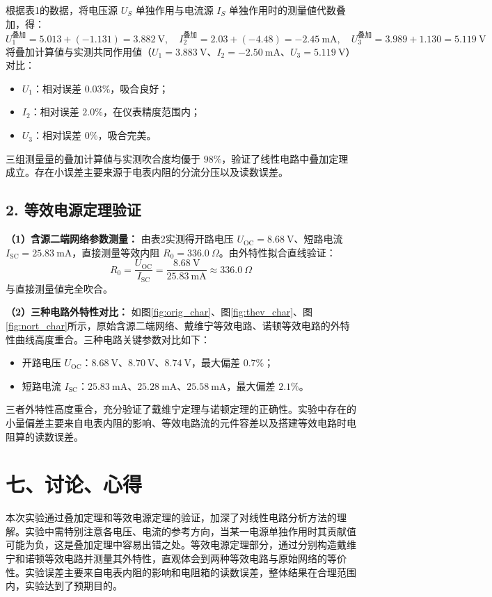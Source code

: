 ﻿\documentclass[10.5pt]{config}
\begin{document}
根据表1的数据，将电压源 $U_S$ 单独作用与电流源 $I_S$ 单独作用时的测量値代数叠加，得：
\begin{equation*}
    U_1^{\text{叠加}} = 5.013 + (-1.131) = 3.882\ \mathrm{V},\quad
    I_2^{\text{叠加}} = 2.03 + (-4.48) = -2.45\ \mathrm{mA},\quad
    U_3^{\text{叠加}} = 3.989 + 1.130 = 5.119\ \mathrm{V}
\end{equation*}
将叠加计算値与实测共同作用値（$U_1=3.883\ \mathrm{V}$、$I_2=-2.50\ \mathrm{mA}$、$U_3=5.119\ \mathrm{V}$）对比：
\begin{itemize}
    \item $U_1$：相对误差 $0.03\%$，吸合良好；
    \item $I_2$：相对误差 $2.0\%$，在仪表精度范围内；
    \item $U_3$：相对误差 $0\%$，吸合完美。
\end{itemize}
三组测量量的叠加计算値与实测吹合度均優于 $98\%$，验证了线性电路中叠加定理成立。存在小误差主要来源于电表内阻的分流分压以及读数误差。

\subsection*{2. 等效电源定理验证}

\textbf{（1）含源二端网络参数测量：}
由表2实测得开路电压 $U_{\mathrm{OC}} = 8.68\ \mathrm{V}$、短路电流 $I_{\mathrm{SC}} = 25.83\ \mathrm{mA}$，直接测量等效内阻 $R_0 = 336.0\ \Omega$。由外特性拟合直线验证：
\begin{equation*}
    R_0 = \frac{U_{\mathrm{OC}}}{I_{\mathrm{SC}}} = \frac{8.68\ \mathrm{V}}{25.83\ \mathrm{mA}} \approx 336.0\ \Omega
\end{equation*}
与直接测量値完全吹合。

\textbf{（2）三种电路外特性对比：}
如图\ref{fig:orig_char}、图\ref{fig:thev_char}、图\ref{fig:nort_char}所示，原始含源二端网络、戴维宁等效电路、诺顿等效电路的外特性曲线高度重合。三种电路关键参数对比如下：
\begin{itemize}
    \item 开路电压 $U_{\mathrm{OC}}$：$8.68\ \mathrm{V}$、$8.70\ \mathrm{V}$、$8.74\ \mathrm{V}$，最大偏差 $0.7\%$；
    \item 短路电流 $I_{\mathrm{SC}}$：$25.83\ \mathrm{mA}$、$25.28\ \mathrm{mA}$、$25.58\ \mathrm{mA}$，最大偏差 $2.1\%$。
\end{itemize}
三者外特性高度重合，充分验证了戴维宁定理与诺顿定理的正确性。实验中存在的小量偏差主要来自电表内阻的影响、等效电路流的元件容差以及搭建等效电路时电阻算的读数误差。

\section*{七、讨论、心得}

本次实验通过叠加定理和等效电源定理的验证，加深了对线性电路分析方法的理解。实验中需特别注意各电压、电流的参考方向，当某一电源单独作用时其贡献值可能为负，这是叠加定理中容易出错之处。等效电源定理部分，通过分别构造戴维宁和诺顿等效电路并测量其外特性，直观体会到两种等效电路与原始网络的等价性。实验误差主要来自电表内阻的影响和电阻箱的读数误差，整体结果在合理范围内，实验达到了预期目的。
\end{document}
